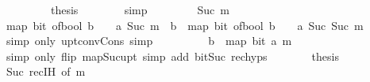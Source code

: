 \begin{isabellebody}
\ {}\isanewline
\ \ \ \ \isamarkupfalse%
\ \isamarkupfalse%
\ {\isacharquery}{\kern0pt}thesis\isanewline
\ \ \ \ \ \ \isamarkupfalse%
\ simp\isanewline
\ \ \isamarkupfalse%
\isanewline
\ \ \ \ \isamarkupfalse%
\ {\isacharparenleft}{\kern0pt}Suc\ m{\isacharparenright}{\kern0pt}\isanewline
\ \ \ \ \isamarkupfalse%
\ {\isacartoucheopen}map\ {\isacharparenleft}{\kern0pt}bit\ {\isacharparenleft}{\kern0pt}of{\isacharunderscore}{\kern0pt}bool\ b\ {\isacharplus}{\kern0pt}\ {}\ {\isacharasterisk}{\kern0pt}\ a{\isacharparenright}{\kern0pt}{\isacharparenright}{\kern0pt}\ {\isacharbrackleft}{\kern0pt}{}{\isachardot}{\kern0pt}{\isachardot}{\kern0pt}{\isacharless}{\kern0pt}Suc\ m{\isacharbrackright}{\kern0pt}\ {\isacharequal}{\kern0pt}\ b\ {\isacharhash}{\kern0pt}\ map\ {\isacharparenleft}{\kern0pt}bit\ {\isacharparenleft}{\kern0pt}of{\isacharunderscore}{\kern0pt}bool\ b\ {\isacharplus}{\kern0pt}\ {}\ {\isacharasterisk}{\kern0pt}\ a{\isacharparenright}{\kern0pt}{\isacharparenright}{\kern0pt}\ {\isacharbrackleft}{\kern0pt}Suc\ {}{\isachardot}{\kern0pt}{\isachardot}{\kern0pt}{\isacharless}{\kern0pt}Suc\ m{\isacharbrackright}{\kern0pt}{\isacartoucheclose}\isanewline
\ \ \ \ \ \ \isamarkupfalse%
\ {\isacharparenleft}{\kern0pt}simp\ only{\isacharcolon}{\kern0pt}\ upt{\isacharunderscore}{\kern0pt}conv{\isacharunderscore}{\kern0pt}Cons{\isacharparenright}{\kern0pt}\ simp\isanewline
\ \ \ \ \isamarkupfalse%
\ \isamarkupfalse%
\ {\isacartoucheopen}{\isasymdots}\ {\isacharequal}{\kern0pt}\ b\ {\isacharhash}{\kern0pt}\ map\ {\isacharparenleft}{\kern0pt}bit\ a{\isacharparenright}{\kern0pt}\ {\isacharbrackleft}{\kern0pt}{}{\isachardot}{\kern0pt}{\isachardot}{\kern0pt}{\isacharless}{\kern0pt}m{\isacharbrackright}{\kern0pt}{\isacartoucheclose}\isanewline
\ \ \ \ \ \ \isamarkupfalse%
\ {\isacharparenleft}{\kern0pt}simp\ only{\isacharcolon}{\kern0pt}\ flip{\isacharcolon}{\kern0pt}\ map{\isacharunderscore}{\kern0pt}Suc{\isacharunderscore}{\kern0pt}upt{\isacharparenright}{\kern0pt}\ {\isacharparenleft}{\kern0pt}simp\ add{\isacharcolon}{\kern0pt}\ bit{\isacharunderscore}{\kern0pt}Suc\ rec{\isachardot}{\kern0pt}hyps{\isacharparenright}{\kern0pt}\isanewline
\ \ \ \ \isamarkupfalse%
\ \isamarkupfalse%
\ {\isacharquery}{\kern0pt}thesis\isanewline
\ \ \ \ \ \ \isamarkupfalse%
\ Suc\ rec{\isachardot}{\kern0pt}IH\ {\isacharbrackleft}{\kern0pt}of\ m{\isacharbrackright}{\kern0pt}\ \isamarkupfalse%

\end{isabellebody}
